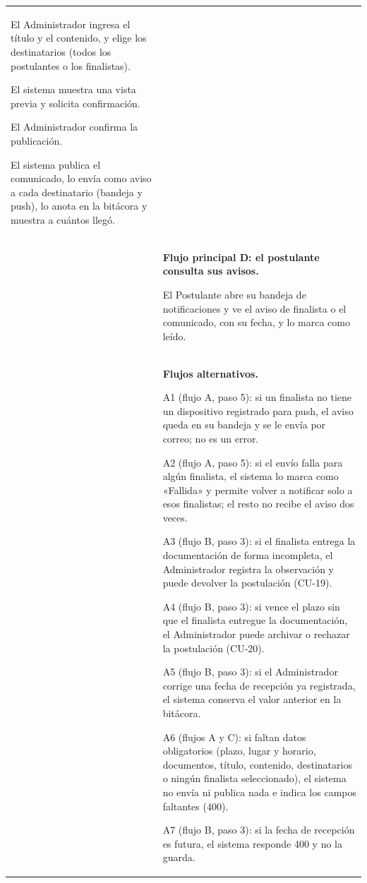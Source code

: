 \begin{longtable}{>{\raggedright\arraybackslash}p{2.9cm} >{\raggedright\arraybackslash}p{12.6cm}}
\begin{cupasos}
    \item El Administrador ingresa el título y el contenido, y elige los destinatarios (todos los postulantes o los finalistas).
    \item El sistema muestra una vista previa y solicita confirmación.
    \item El Administrador confirma la publicación.
    \item El sistema publica el comunicado, lo envía como aviso a cada destinatario (bandeja y push), lo anota en la bitácora y muestra a cuántos llegó.
\end{cupasos} \\
 & \textbf{Flujo principal D: el postulante consulta sus avisos.}
\begin{cupasos}
    \item El Postulante abre su bandeja de notificaciones y ve el aviso de finalista o el comunicado, con su fecha, y lo marca como leído.
\end{cupasos} \\
 & \textbf{Flujos alternativos.}
\begin{cuvin}
    \item A1 (flujo A, paso 5): si un finalista no tiene un dispositivo registrado para push, el aviso queda en su bandeja y se le envía por correo; no es un error.
    \item A2 (flujo A, paso 5): si el envío falla para algún finalista, el sistema lo marca como «Fallida» y permite volver a notificar solo a esos finalistas; el resto no recibe el aviso dos veces.
    \item A3 (flujo B, paso 3): si el finalista entrega la documentación de forma incompleta, el Administrador registra la observación y puede devolver la postulación (CU-19).
    \item A4 (flujo B, paso 3): si vence el plazo sin que el finalista entregue la documentación, el Administrador puede archivar o rechazar la postulación (CU-20).
    \item A5 (flujo B, paso 3): si el Administrador corrige una fecha de recepción ya registrada, el sistema conserva el valor anterior en la bitácora.
    \item A6 (flujos A y C): si faltan datos obligatorios (plazo, lugar y horario, documentos, título, contenido, destinatarios o ningún finalista seleccionado), el sistema no envía ni publica nada e indica los campos faltantes (400).
    \item A7 (flujo B, paso 3): si la fecha de recepción es futura, el sistema responde 400 y no la guarda.

\end{cuvin}
\end{longtable}

